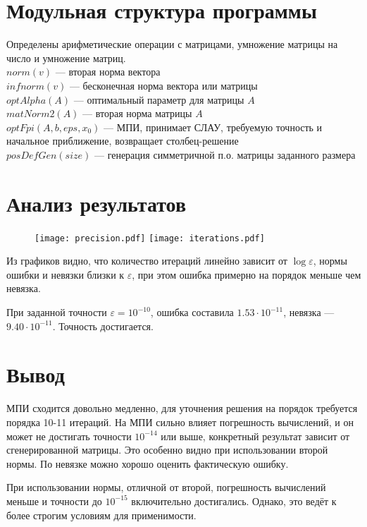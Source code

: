 \documentclass[11pt,a4paper]{article}
\let\epsilon\varepsilon
\renewcommand\;{\hspace{1cm}}
\begin{document}
\section{Модульная структура программы}
Определены арифметические операции с матрицами, умножение матрицы на число и умножение матриц.\\
$norm(v)$ --- вторая норма вектора\\
$infnorm(v)$ --- бесконечная норма вектора или матрицы\\
$optAlpha(A)$ --- оптимальный параметр для матрицы $A$\\
$matNorm2(A)$ --- вторая норма матрицы $A$\\
$optFpi(A,b,eps,x_{0})$ --- МПИ, принимает СЛАУ, требуемую точность и начальное приближение, возвращает столбец-решение\\
$posDefGen(size)$ --- генерация симметричной п.о. матрицы заданного размера
\section{Анализ результатов}
\begin{figure}[h]
\texttt{[image: precision.pdf]}
\texttt{[image: iterations.pdf]}
\end{figure}
Из графиков видно, что количество итераций линейно зависит от $\log{\epsilon}$, нормы ошибки и невязки близки к $\epsilon$, при этом ошибка примерно на порядок меньше чем невязка.

При заданной точности $\epsilon = 10^{-10}$, ошибка составила $1.53 \cdot 10^{-11}$, невязка --- $9.40 \cdot 10^{-11}$. Точность достигается.
\section{Вывод}
МПИ сходится довольно медленно, для уточнения решения на порядок требуется порядка 10-11 итераций.
На МПИ сильно влияет погрешность вычислений, и он может не достигать точности $10^{-14}$ или выше, конкретный результат зависит от сгенерированной матрицы. Это особенно видно при использовании второй нормы. По невязке можно хорошо оценить фактическую ошибку.

При использовании нормы, отличной от второй, погрешность вычислений меньше и точности до $10^{-15}$ включительно достигались. Однако, это ведёт к более строгим условиям для применимости.
\end{document}
